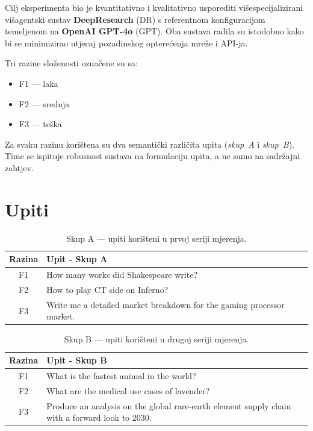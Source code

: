 \documentclass[zavrsnirad]{fer}
\begin{document}
Cilj eksperimenta bio je kvantitativno i kvalitativno usporediti
višespecijalizirani višagentski sustav \textbf{DeepResearch} (DR) s
referentnom konfiguracijom temeljenom na \textbf{OpenAI GPT-4o}
(GPT). Oba sustava radila su istodobno kako bi se minimizirao utjecaj
pozadinskog opterećenja mreže i API-ja.

Tri razine složenosti označene su sa:

\begin{itemize}
    \item F1 — laka
    \item F2 — srednja
    \item F3 — teška
\end{itemize}

Za svaku razinu korištena su dva semantički različita upita
(\emph{skup~A} i \emph{skup~B}). Time se ispituje robusnost
sustava na formulaciju upita, a ne samo na sadržajni zahtjev.

\section{Upiti}
\label{sec:prompts}

\begin{table}[H]
  \centering
  \begin{tabular}{c|p{11cm}}
    \hline
    \textbf{Razina} & \textbf{Upit - Skup A} \\ \hline
    F1 & How many works did Shakespeare write? \\
    F2 & How to play CT side on Inferno?  \\
    F3 & Write me a detailed market breakdown for 
    the gaming processor market.  \\
    \hline
  \end{tabular}
  \caption{Skup A — upiti korišteni u prvoj seriji mjerenja.}
\end{table}

\begin{table}[H]
  \centering
  \begin{tabular}{c|p{11cm}}
    \hline
    \textbf{Razina} & \textbf{Upit - Skup B} \\ \hline
    F1 & What is the fastest animal in the world? \\
    F2 & What are the medical use cases of lavender? \\
    F3 & Produce an analysis on the global rare-earth 
    element supply chain with a forward look to 2030. \\
    \hline
  \end{tabular}
  \caption{Skup B — upiti korišteni u drugoj seriji mjerenja.}
\end{table}
\end{document}
